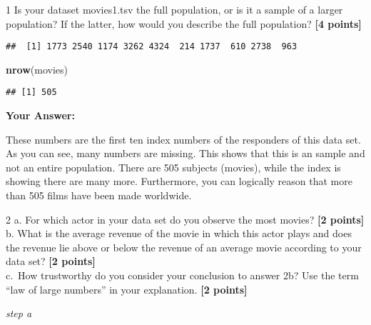 \documentclass[
]{article}
\newenvironment{Shaded}{\begin{snugshade}}{\end{snugshade}}
\newcommand{\AttributeTok}[1]{\textcolor[rgb]{0.13,0.29,0.53}{#1}}
\newcommand{\CommentTok}[1]{\textcolor[rgb]{0.56,0.35,0.01}{\textit{#1}}}
\newcommand{\ConstantTok}[1]{\textcolor[rgb]{0.56,0.35,0.01}{#1}}
\newcommand{\DecValTok}[1]{\textcolor[rgb]{0.00,0.00,0.81}{#1}}
\newcommand{\FunctionTok}[1]{\textcolor[rgb]{0.13,0.29,0.53}{\textbf{#1}}}
\newcommand{\NormalTok}[1]{#1}
\newcommand{\OtherTok}[1]{\textcolor[rgb]{0.56,0.35,0.01}{#1}}
\newcommand{\SpecialCharTok}[1]{\textcolor[rgb]{0.81,0.36,0.00}{\textbf{#1}}}
\begin{document}
1 Is your dataset movies1.tsv the full population, or is it a sample of
a larger population? If the latter, how would you describe the full
population? \textbf{[4 points]}

\begin{Shaded}
\end{Shaded}

\begin{verbatim}
##  [1] 1773 2540 1174 3262 4324  214 1737  610 2738  963
\end{verbatim}

\begin{Shaded}
\begin{Highlighting}[]
\FunctionTok{nrow}\NormalTok{(movies)}
\end{Highlighting}
\end{Shaded}

\begin{verbatim}
## [1] 505
\end{verbatim}

\textbf{Your Answer:}

These numbers are the first ten index numbers of the responders of this
data set. As you can see, many numbers are missing. This shows that this
is an sample and not an entire population. There are 505 subjects
(movies), while the index is showing there are many more. Furthermore,
you can logically reason that more than 505 films have been made
worldwide.

2 a. For which actor in your data set do you observe the most movies?
\textbf{[2 points]} b. What is the average revenue of the movie in which
this actor plays and does the revenue lie above or below the revenue of
an average movie according to your data set? \textbf{[2 points]}\\
c.~How trustworthy do you consider your conclusion to answer 2b? Use the
term ``law of large numbers'' in your explanation. \textbf{[2 points]}

\emph{step a}

\begin{Shaded}
\end{Shaded}
\end{document}
